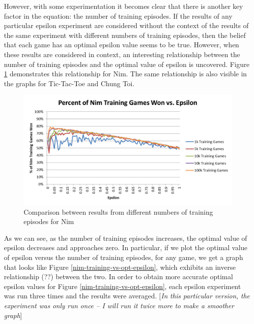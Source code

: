 \documentclass[11pt,a4paper]{report}
\begin{document}
However, with some experimentation it becomes clear that there is another key factor in the equation: the number of training episodes. If the results of any particular epsilon experiment are considered without the context of the results of the same experiment with different numbers of training episodes, then the belief that each game has an optimal epsilon value seems to be true. However, when these results are considered in context, an interesting relationship between the number of training episodes and the optimal value of epsilon is uncovered. Figure \ref{nim-epsilon-win-comparison} demonstrates this relationship for Nim. The same relationship is also visible in the graphs for Tic-Tac-Toe and Chung Toi.

\begin{figure}[htbp]
	\begin{center}
		\includegraphics[width=125mm]{Nim_EpsilonResults_Wins_Comparison.png}
		\caption{Comparison between results from different numbers of training episodes for Nim}
		\label{nim-epsilon-win-comparison}
	\end{center}
\end{figure}

As we can see, as the number of training episodes increases, the optimal value of epsilon decreases and approaches zero. In particular, if we plot the optimal value of epsilon versus the number of training episodes, for any game, we get a graph that looks like Figure \ref{nim-training-vs-opt-epsilon}, which exhibits an inverse relationship (??) between the two. In order to obtain more accurate optimal epsilon values for Figure \ref{nim-training-vs-opt-epsilon}, each epsilon experiment was run three times and the results were averaged. [\emph{In this particular version, the experiment was only run once -- I will run it twice more to make a smoother graph}]%
\end{document}
